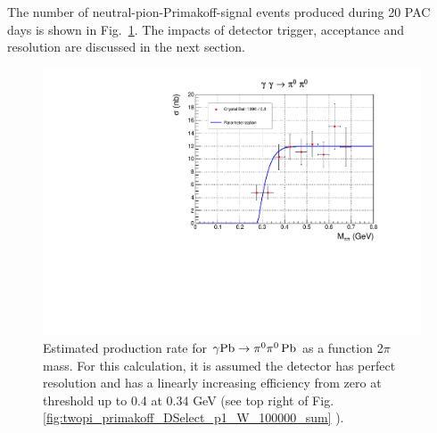 The number of neutral-pion-Primakoff-signal events produced during 20
PAC days is shown in Fig.~\ref{fig:sigma_2pi0_figs_3}. The impacts of
detector trigger, acceptance and resolution are discussed in the next
section.
\begin{figure}[tph]
\centering
\includegraphics[page=3,width=4.75in]{figures/sigma_2pi0_figs.pdf}
\caption{Estimated production rate  for $\gamma \rm{Pb}\rightarrow \pi^0\pi^0\,\rm{Pb}$ as a function 2$\pi$ mass. For this calculation, it is assumed the detector has perfect resolution and has a linearly increasing efficiency from zero at threshold up to 0.4 at 0.34 GeV (see top right of Fig.\,\ref{fig:twopi_primakoff_DSelect_p1_W_100000_sum} ).
\label{fig:sigma_2pi0_figs_3}}
\end{figure}

